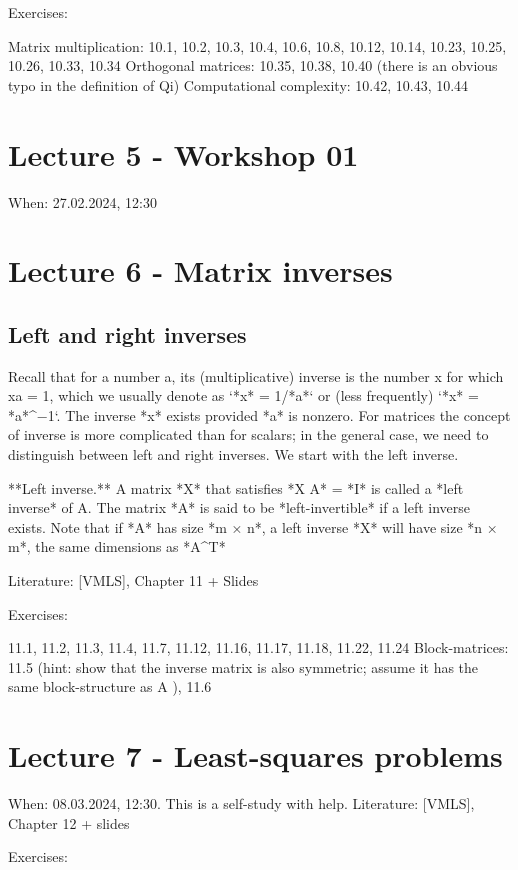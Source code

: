 \documentclass{article}
\begin{document}
{{{{{{{{{{{{Exercises:

Matrix multiplication: 10.1, 10.2, 10.3, 10.4, 10.6, 10.8, 10.12, 10.14, 10.23, 10.25, 10.26, 10.33, 10.34
Orthogonal matrices: 10.35, 10.38, 10.40 (there is an obvious typo in the definition of Qi)
Computational complexity: 10.42, 10.43, 10.44

\section*{Lecture 5 - Workshop 01}

When: 27.02.2024, 12:30

\section*{Lecture 6 - Matrix inverses}


\subsection*{Left and right inverses}
Recall that for a number a, its (multiplicative) inverse is the number x for which
xa = 1, which we usually denote as `*x* = 1/*a*` or (less frequently) `*x* = *a*^−1`. The inverse *x* exists provided *a* is nonzero. For matrices the concept of inverse is more complicated than for scalars; in the general case, we need to distinguish between left and right inverses. We start with the left inverse.

**Left inverse.** A matrix *X* that satisfies 
*X A* = *I*
is called a *left inverse* of A. The matrix *A* is said to be *left-invertible* if a left inverse exists. Note that if *A* has size *m × n*, a left inverse *X* will have size *n × m*,
the same dimensions as *A^T*


Literature: [VMLS], Chapter 11 + Slides

Exercises:

11.1, 11.2, 11.3, 11.4, 11.7, 11.12, 11.16, 11.17, 11.18, 11.22, 11.24
Block-matrices: 11.5 (hint: show that the inverse matrix is also symmetric; assume it has the same block-structure as A
), 11.6

\section*{Lecture 7 - Least-squares problems}

When: 08.03.2024, 12:30. This is a self-study with help.
Literature: [VMLS], Chapter 12 + slides

Exercises:

}}}}}}}}}}}}
\end{document}
